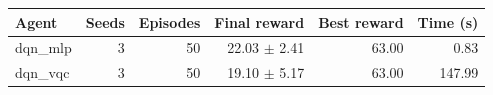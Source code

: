 \begin{tabular}{lrrrrr}
\hline
Agent & Seeds & Episodes & Final reward & Best reward & Time (s) \\
\hline
dqn_mlp & 3 & 50 & 22.03 $\pm$ 2.41 & 63.00 & 0.83 \\
dqn_vqc & 3 & 50 & 19.10 $\pm$ 5.17 & 63.00 & 147.99 \\
\hline
\end{tabular}
